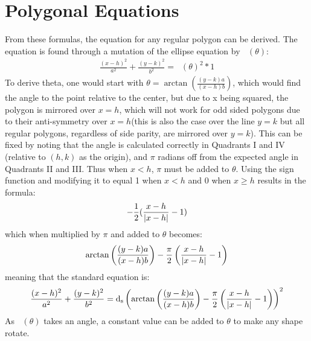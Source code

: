 \documentclass[11pt]{article}
\DeclareMathOperator{\custd}{\mathrm{d}_s}
\DeclareMathOperator{\custdsq}{\mathrm{d}_s}
\DeclarePairedDelimiter\abs{\lvert}{\rvert}%
\begin{document}
\section{Polygonal Equations}
From these formulas, the equation for any regular polygon can be derived. The equation is found through a mutation of the ellipse equation by \(\custd(\theta)\):
\begin{gather*}
\frac{(x-h)^2}{a^2}+\frac{(y-k)^2}{b^2}=\custd(\theta)^2*1
\end{gather*}
To derive theta, one would start with \(\theta=\arctan(\frac{(y-k)a}{(x-h)b})\), which would find the angle to the point relative to the center, but due to x being squared, the polygon is mirrored over \(x=h\), which will not work for odd sided polygons due to their anti-symmetry over \(x=h\)(this is also the case over the line \(y=k\) but all regular polygons, regardless of side parity, are mirrored over \(y=k\)). This can be fixed by noting that the angle is calculated correctly in Quadrants I and IV (relative to \((h,k)\) as the origin), and \(\pi\) radians off from the expected angle in Quadrants II and III. Thus when \(x<h\), \(\pi\) must be added to \(\theta\). Using the sign function and modifying it to equal 1 when \(x<h\) and 0 when \(x\geq h\) results in the formula:
\begin{gather*}
-\frac{1}{2}(\frac{x-h}{\abs{x-h}}-1)
\end{gather*}
which when multiplied by \(\pi\) and added to \(\theta\) becomes:
\begin{gather*}
\arctan\left(\frac{(y-k)a}{(x-h)b}\right)-\frac{\pi}{2}\left(\frac{x-h}{\abs{x-h}}-1\right)
\end{gather*}
meaning that the standard equation is:
\begin{gather*}
\frac{(x-h)^2}{a^2}+\frac{(y-k)^2}{b^2}=\custdsq\left(\arctan\left(\frac{(y-k)a}{(x-h)b}\right)-\frac{\pi}{2}\left(\frac{x-h}{\abs{x-h}}-1\right)\right)^2
\end{gather*}
As \(\custd(\theta)\) takes an angle, a constant value can be added to \(\theta\) to make any shape rotate.
\end{document}
